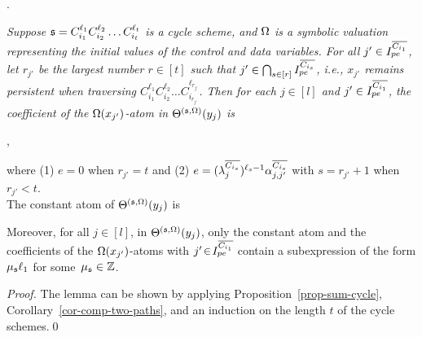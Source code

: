 \begin{appendix}
.
{\it 
Suppose ${\mathfrak{s} }=C_{i_1}^{\ell_1} C_{i_2}^{\ell_2} \dots C_{i_t}^{\ell_t}$ is a cycle scheme, and $\Omega$ is a symbolic valuation representing the initial values of the control and data variables. 
For all $j' \in  I^{\overline{C_{i_{1}}}}_{pe}$, let $r_{j'}$ be the largest number $r \in [t]$ such that $j'\in\bigcap_{s\in[r]} I^{\overline{C_{i_{s}}}}_{pe}$, i.e., $x_{j'}$ remains persistent when traversing $C_{i_1}^{\ell_1} C_{i_2}^{\ell_2} \dots C_{i_{r_{j'}}}^{\ell_{r_{j'}}}$.
Then for each $j\in [l]$ and $j' \in  I^{\overline{C_{i_{1}}}}_{pe}$, the coefficient of the $\Omega(x_{j'})$-atom in $\Theta^{({\mathfrak{s} },\Omega)}(y_j)$ is 
\begin{center}
,
\end{center}
where (1) $e\!=\!0$ when $r_{j'}\!=\!t$ and (2) $e=(\lambda^{\overline{C_{i_s}}}_{j})^{\ell_s-1} \alpha^{\overline{C_{i_{s}}}}_{j,j'}$ with $s=r_{j'}+1$ when $r_{j'}<t$.\\
The constant atom of $\Theta^{({\mathfrak{s} },\Omega)}(y_j)$ is 
\begin{center}
\end{center}
Moreover, for all $j\!\in\! [l]$, in $\Theta^{({\mathfrak{s} },\Omega)}(y_j)$, only the constant atom and the coefficients of the $\Omega(x_{j'})$-atoms with $j' \!\in\!I^{\overline{C_{i_{1}}}}_{pe}$ contain a subexpression of the form $ \mu_{\mathfrak{s} } \ell_1$ for some~$\mu_{\mathfrak{s} }\in {\mathbb{Z} }$.
}

\begin{proof}
The lemma can be shown by applying Proposition~\ref{prop-sum-cycle}, Corollary~\ref{cor-comp-two-paths}, and an induction on the length $t$ of the cycle schemes.\qed
\end{proof}


\hide
{
\smallskip

}
\end{appendix}

